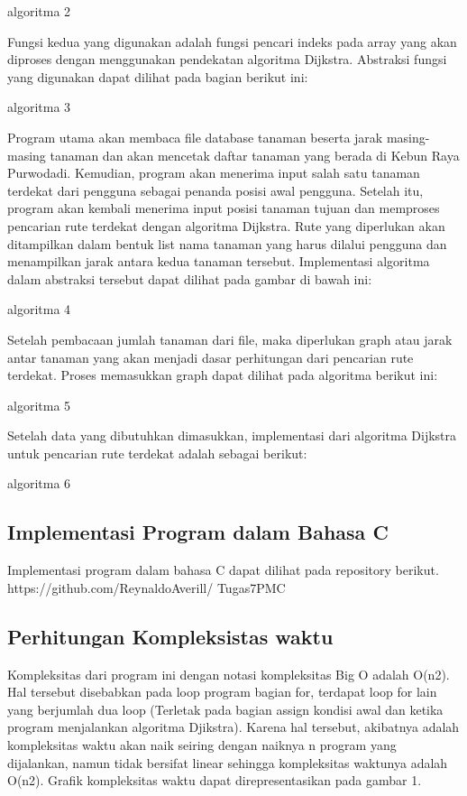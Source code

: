 \documentclass[conference]{IEEEtran}
\begin{document}
algoritma 2

Fungsi kedua yang digunakan adalah fungsi pencari indeks
pada array yang akan diproses dengan menggunakan pendekatan
algoritma Dijkstra. Abstraksi fungsi yang digunakan
dapat dilihat pada bagian berikut ini:

algoritma 3

Program utama akan membaca file database tanaman
beserta jarak masing-masing tanaman dan akan mencetak
daftar tanaman yang berada di Kebun Raya Purwodadi.
Kemudian, program akan menerima input salah satu tanaman
terdekat dari pengguna sebagai penanda posisi awal pengguna.
Setelah itu, program akan kembali menerima input posisi
tanaman tujuan dan memproses pencarian rute terdekat dengan
algoritma Dijkstra. Rute yang diperlukan akan ditampilkan
dalam bentuk list nama tanaman yang harus dilalui pengguna
dan menampilkan jarak antara kedua tanaman tersebut.
Implementasi algoritma dalam abstraksi tersebut dapat dilihat
pada gambar di bawah ini:

algoritma 4

Setelah pembacaan jumlah tanaman dari file, maka diperlukan
graph atau jarak antar tanaman yang akan menjadi dasar
perhitungan dari pencarian rute terdekat. Proses memasukkan
graph dapat dilihat pada algoritma berikut ini:

algoritma 5

Setelah data yang dibutuhkan dimasukkan, implementasi
dari algoritma Dijkstra untuk pencarian rute terdekat adalah
sebagai berikut:

algoritma 6

\subsection{Implementasi Program dalam Bahasa C}
Implementasi program dalam bahasa C dapat dilihat
pada repository berikut. https://github.com/ReynaldoAverill/
Tugas7PMC

\subsection{Perhitungan Kompleksistas waktu}
Kompleksitas dari program ini dengan notasi kompleksitas
Big O adalah O(n2). Hal tersebut disebabkan pada loop
program bagian for, terdapat loop for lain yang berjumlah
dua loop (Terletak pada bagian assign kondisi awal dan ketika
program menjalankan algoritma Djikstra). Karena hal tersebut,
akibatnya adalah kompleksitas waktu akan naik seiring dengan
naiknya n program yang dijalankan, namun tidak bersifat
linear sehingga kompleksitas waktunya adalah O(n2). Grafik
kompleksitas waktu dapat direpresentasikan pada gambar 1.
\end{document}
